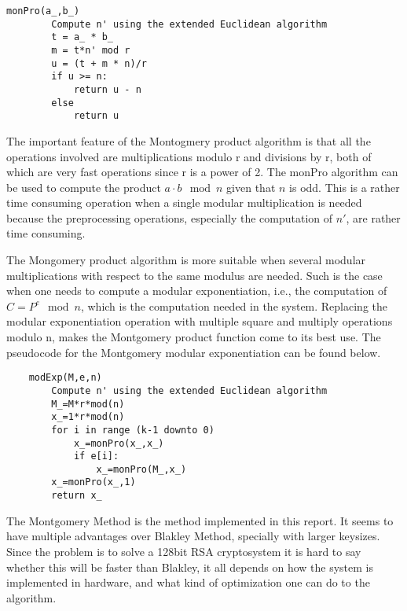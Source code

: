 \begin{lstlisting}[label=lst:monpro, caption=The Montgomery product algorithm]
    monPro(a_,b_)
        Compute n' using the extended Euclidean algorithm
        t = a_ * b_
        m = t*n' mod r
        u = (t + m * n)/r
        if u >= n:
            return u - n
        else
            return u
\end{lstlisting}
%
The important feature of the Montogmery product algorithm is that all the operations involved are multiplications modulo r and divisions by r, both of which are very fast operations since r is a power of 2. The monPro algorithm can be used to compute the product $a \cdot b \mod{n}$ given that $n$ is odd. This is a rather time consuming operation when a single modular multiplication is needed because the preprocessing operations, especially the computation of $n'$, are rather time consuming.

The Mongomery product algorithm is more suitable when several modular multiplications with respect to the same modulus are needed. Such is the case when one needs to compute a modular exponentiation, i.e., the computation of $C=P^e\mod{n}$, which is the computation needed in the system. Replacing the modular exponentiation operation with multiple square and multiply operations modulo n, makes the Montgomery product function come to its best use. The pseudocode for the Montgomery modular exponentiation can be found below.
\begin{lstlisting}
    modExp(M,e,n) 
        Compute n' using the extended Euclidean algorithm
        M_=M*r*mod(n)
        x_=1*r*mod(n)
        for i in range (k-1 downto 0)
            x_=monPro(x_,x_)
            if e[i]:
                x_=monPro(M_,x_)
        x_=monPro(x_,1)
        return x_
\end{lstlisting}
%
The Montgomery Method is the method implemented in this report. It seems to have multiple advantages over Blakley Method, specially with larger keysizes. Since the problem is to solve a 128bit RSA cryptosystem it is hard to say whether this will be faster than Blakley, it all depends on how the system is implemented in hardware, and what kind of optimization one can do to the algorithm. 
%
